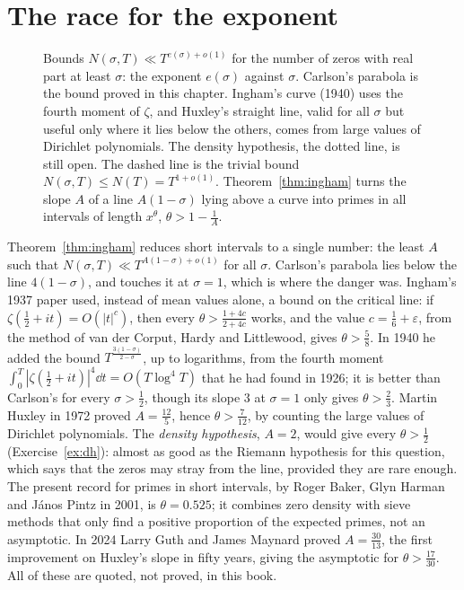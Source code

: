 \section{The race for the exponent}

\begin{figure}[ht]
\centering
{}
\caption{Bounds $N(\sigma,T)\ll T^{e(\sigma)+o(1)}$ for the number of zeros with real part at least $\sigma$: the exponent $e(\sigma)$ against $\sigma$. Carlson's parabola is the bound proved in this chapter. Ingham's curve (1940) uses the fourth moment of $\zeta$, and Huxley's straight line, valid for all $\sigma$ but useful only where it lies below
the others, comes from large values of Dirichlet polynomials. The density hypothesis, the dotted line, is still open. The dashed line is the trivial bound $N(\sigma,T)\le N(T)=T^{1+o(1)}$. Theorem~\ref{thm:ingham} turns the slope $A$ of a line $A(1-\sigma)$ lying above a curve into primes in all intervals of length $x^\theta$, $\theta>1-\frac1A$.}
\label{fig:density}
\end{figure}

Theorem~\ref{thm:ingham} reduces short intervals to a single number: the least $A$ such that $N(\sigma,T)\ll T^{A(1-\sigma)+o(1)}$ for all $\sigma$. Carlson's parabola lies below the line $4(1-\sigma)$, and touches it at $\sigma=1$, which is where the danger was. Ingham's 1937 paper used, instead of mean values alone, a bound on the critical line: if $\zeta(\frac12+it)=O(|t|^{c})$, then every $\theta>\frac{1+4c}{2+4c}$ works, and the value $c=\frac16+\varepsilon$, from the method of van der Corput, Hardy and Littlewood, gives $\theta>\frac58$. In 1940 he added the
bound $T^{\frac{3(1-\sigma)}{2-\sigma}}$, up to logarithms, from the fourth moment $\int_0^T|\zeta(\frac12+it)|^4\dd t=O(T\log^4T)$ that he had found in 1926; it is better than Carlson's for every $\sigma>\frac12$, though its slope $3$ at $\sigma=1$ only gives $\theta>\frac23$. Martin Huxley in 1972 proved $A=\frac{12}5$, hence $\theta>\frac7{12}$, by counting the large values of Dirichlet polynomials. The
\emph{density hypothesis}, $A=2$, would give every $\theta>\frac12$ (Exercise~\ref{ex:dh}): almost as good as the Riemann hypothesis for this question, which says that the zeros may stray from the line, provided they are rare enough. The present record for primes in short intervals, by Roger Baker, Glyn Harman and J\'anos Pintz in 2001, is $\theta=0.525$; it combines
zero density with sieve methods that only find a positive proportion of the expected primes, not an asymptotic. In 2024 Larry Guth and James Maynard proved $A=\frac{30}{13}$, the first improvement on Huxley's slope in fifty years, giving the asymptotic for $\theta>\frac{17}{30}$. All of these are quoted, not proved, in this book.

